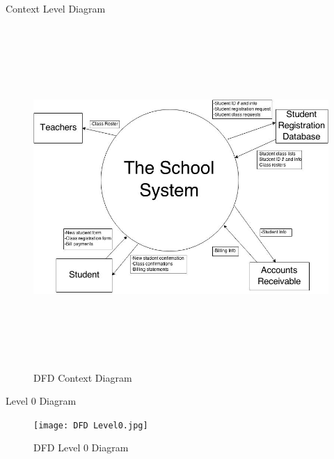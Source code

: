 \documentclass{article}
\begin{document}
\begin{section}{Context Level Diagram}
    \begin{figure}[h!]
        \begin{center}
           \centerline{ \includegraphics[height=13cm]{DF.jpg}}
            \caption{DFD Context Diagram}
        \end{center}
    \end{figure}
\end{section}
\newpage
\begin{section}{Level 0 Diagram}
    \begin{figure}[h!]
        \begin{center}
            \centerline{\texttt{[image: DFD Level0.jpg]}}
            \caption{DFD Level 0 Diagram}
        \end{center}
    \end{figure}
\end{section}
\newpage
\end{document}
